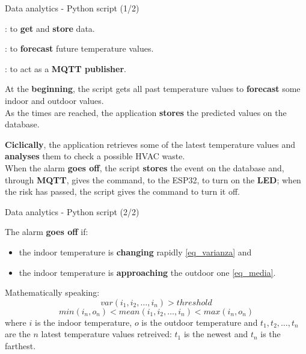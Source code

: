 \documentclass{beamer}
\begin{document}
\begin{frame}{Data analytics -  Python script (1/2)}

	\begin{description}[\texttt{influxdb-client}]		%
		\item[\texttt{influxdb-client}]: to \textbf{get} and \textbf{store} data.
		\item[\texttt{prophet}]: to \textbf{forecast} future temperature values.
		\item[\texttt{paho-mqtt}]: to act as a \textbf{MQTT publisher}.
	\end{description}

	\vfill

	At the \textbf{beginning}, the script gets all past temperature values to \textbf{forecast} some indoor and outdoor values.\\As the times are reached, the application \textbf{stores} the predicted values on the database.
	
	\vfill
	
	\textbf{Ciclically}, the application retrieves some of the latest temperature values and \textbf{analyses} them to check a possible HVAC waste.\\
	When the alarm \textbf{goes off}, the script \textbf{stores} the event on the database and, through \textbf{MQTT}, gives the command, to the ESP32, to turn on the \textbf{LED}; when the risk has passed, the script gives the command to turn it off.

\end{frame}


\begin{frame}{Data analytics -  Python script (2/2)}

	The alarm \textbf{goes off} if:
	\begin{itemize}
		\item the indoor temperature is \textbf{changing} rapidly \eqref{eq_varianza} and
		\item the indoor temperature is \textbf{approaching} the outdoor one \eqref{eq_media}.
	\end{itemize}
	
	\vfill
	
	Mathematically speaking:
	\begin{equation}
	var(i_1, i_2, \dots, i_n) > threshold \label{eq_varianza}
	\end{equation}
	\begin{equation}
	min(i_n, o_n) < mean(i_1, i_2, \dots, i_n) < max(i_n, o_n) \label{eq_media}
	\end{equation}
	where $i$ is the indoor temperature, $o$ is the outdoor temperature and $t_1, t_2, \dots, t_n$ are the $n$ latest temperature values retreived: $t_1$ is the newest and $t_n$ is the farthest.

\end{frame}
\end{document}
